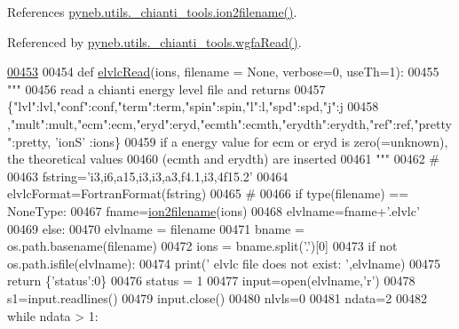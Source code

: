 References \hyperlink{__chianti__tools_8py_source_l00396}{pyneb.\-utils.\-\_\-chianti\-\_\-tools.\-ion2filename()}.



Referenced by \hyperlink{__chianti__tools_8py_source_l00572}{pyneb.\-utils.\-\_\-chianti\-\_\-tools.\-wgfa\-Read()}.


\begin{DoxyCode}
\hypertarget{namespacepyneb_1_1utils_1_1__chianti__tools_l00453}{}\hyperlink{namespacepyneb_1_1utils_1_1__chianti__tools_ac848d0b5ea14bf4adf6e8cd5d46fb639}{00453} 
00454 \textcolor{keyword}{def }\hyperlink{namespacepyneb_1_1utils_1_1__chianti__tools_ac848d0b5ea14bf4adf6e8cd5d46fb639}{elvlcRead}(ions, filename = None, verbose=0,  useTh=1):
00455     \textcolor{stringliteral}{"""}
00456 \textcolor{stringliteral}{    read a chianti energy level file and returns}
00457 \textcolor{stringliteral}{    \{"lvl":lvl,"conf":conf,"term":term,"spin":spin,"l":l,"spd":spd,"j":j}
00458 \textcolor{stringliteral}{    ,"mult":mult,"ecm":ecm,"eryd":eryd,"ecmth":ecmth,"erydth":erydth,"ref":ref,"pretty":pretty, 'ionS'
      :ions\}}
00459 \textcolor{stringliteral}{    if a energy value for ecm or eryd is zero(=unknown), the theoretical values}
00460 \textcolor{stringliteral}{    (ecmth and erydth) are inserted}
00461 \textcolor{stringliteral}{    """}
00462     \textcolor{comment}{#}
00463     fstring=\textcolor{stringliteral}{'i3,i6,a15,i3,i3,a3,f4.1,i3,4f15.2'}
00464     elvlcFormat=FortranFormat(fstring)
00465     \textcolor{comment}{#}
00466     \textcolor{keywordflow}{if} type(filename) == NoneType:
00467         fname=\hyperlink{namespacepyneb_1_1utils_1_1__chianti__tools_a7748521ca99103785680d691667ce851}{ion2filename}(ions)
00468         elvlname=fname+\textcolor{stringliteral}{'.elvlc'}
00469     \textcolor{keywordflow}{else}:
00470         elvlname = filename
00471         bname = os.path.basename(filename)
00472         ions = bname.split(\textcolor{stringliteral}{'.'})[0]
00473     \textcolor{keywordflow}{if} \textcolor{keywordflow}{not} os.path.isfile(elvlname):
00474         print(\textcolor{stringliteral}{' elvlc file does not exist:  '},elvlname)
00475         \textcolor{keywordflow}{return} \{\textcolor{stringliteral}{'status'}:0\}
00476     status = 1
00477     input=open(elvlname,\textcolor{stringliteral}{'}\textcolor{stringliteral}{r')}
00478 \textcolor{stringliteral}{    s1=input.readlines()}
00479 \textcolor{stringliteral}{    input.close()}
00480 \textcolor{stringliteral}{    nlvls=0}
00481 \textcolor{stringliteral}{    ndata=2}
00482 \textcolor{stringliteral}{    }\textcolor{keywordflow}{while} ndata > 1:

\end{DoxyCode}
